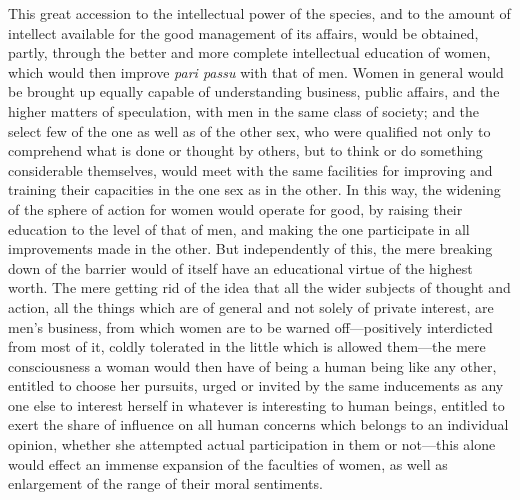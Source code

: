 \documentclass[12pt]{report}
\begin{document}
This great accession to the intellectual power of the species, and to the amount of intellect available for the good management of its affairs, would be obtained, partly, through the better and more complete intellectual education of women, which would then improve \emph{pari passu} with that of men. Women in general would be brought up equally capable of understanding business, public affairs, and the higher matters of speculation, with men in the same class of society; and the select few of the one as well as of the other sex, who were qualified not only to comprehend what is done or thought by others, but to think or do something considerable themselves, would meet with the same facilities for improving and training their capacities in the one sex as in the other. In this way, the widening of the sphere of action for women would operate for good, by raising their education to the level of that of men, and making the one participate in all improvements made in the other. But independently of this, the mere breaking down of the barrier would of itself have an educational virtue of the highest worth. The mere getting rid of the idea that all the wider subjects of thought and action, all the things which are of general and not solely of private interest, are men's business, from which women are to be warned off—positively interdicted from most of it, coldly tolerated in the little which is allowed them—the mere consciousness a woman would then have of being a human being like any other, entitled to choose her pursuits, urged or invited by the same inducements as any one else to interest herself in whatever is interesting to human beings, entitled to exert the share of influence on all human concerns which belongs to an individual opinion, whether she attempted actual participation in them or not—this alone would effect an immense expansion of the faculties of women, as well as enlargement of the range of their moral sentiments.
\end{document}

